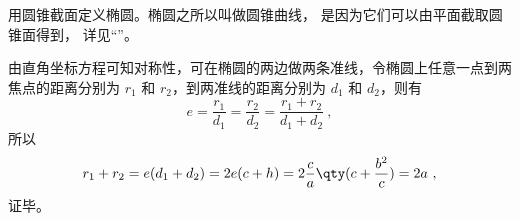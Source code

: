 用圆锥截面定义椭圆。椭圆之所以叫做圆锥曲线， 是因为它们可以由平面截取圆锥面得到， 详见“”。



由直角坐标方程可知对称性，可在椭圆的两边做两条准线，令椭圆上任意一点到两焦点的距离分别为 $r_1$ 和 $r_2$，到两准线的距离分别为 $d_1$ 和 $d_2$，则有
\begin{equation}
e = \frac{r_1}{d_1} = \frac{r_2}{d_2} = \frac{r_1 + r_2}{d_1 + d_2}~,
\end{equation}
所以
\begin{equation}\label{eq_Elips3_9}
r_1 + r_2 = e(d_1+d_2) = 2e(c + h) = 2\frac{c}{a} \qty( c + \frac{b^2}{c} ) = 2a~,
\end{equation}
证毕。